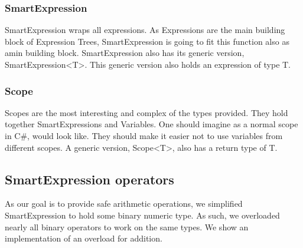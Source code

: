\subsubsection{SmartExpression}
SmartExpression wraps all expressions. As Expressions are the main building block of Expression Trees, SmartExpression is going to fit this function also as amin building block. SmartExpression also has its generic version, SmartExpression<T>. This generic version also holds an expression of type T. 


\subsubsection{Scope}
Scopes are the most interesting and complex of the types provided. They hold together SmartExpressions and Variables. One should imagine as a normal scope in C\#, would look like. They should make it easier not to use variables from different scopes. A generic version, Scope<T>, also has a return type of T. 


\subsection{SmartExpression operators}
As our goal is to provide safe arithmetic operations, we simplified SmartExpression to hold some binary numeric type. As such, we overloaded nearly all binary operators to work on the same types. We show an implementation of an overload for addition.

